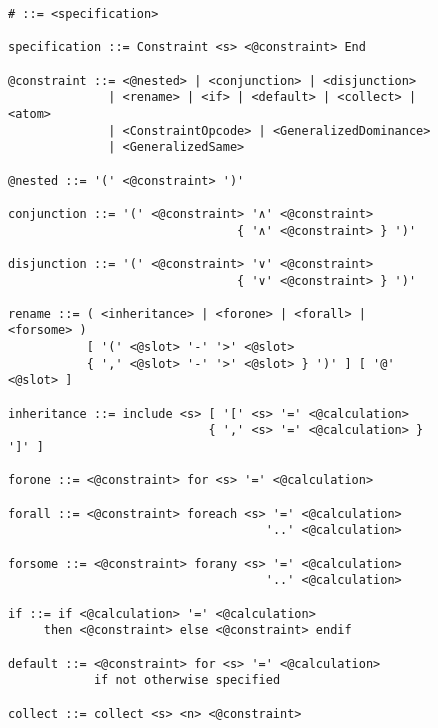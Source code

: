 \begin{figure}[h]
\begin{lstlisting}[language=BNF,basicstyle=\linespread{0.75}\small\ttfamily,
                   captionpos=t,caption=
   {Verbatim display of the grammar file that is used to generate the parser for
    CAnDL.
    The file is in a custom version of Backus–Naur form.
    In the parse tree, all expressions that start with ``{@}'' are
    automatically expanded.
    The character ``\#'' marks the top-level language construct.
    Any expression that does not ultimately become part of this construct
    constitutes a syntax error.}]
# ::= <specification>

specification ::= Constraint <s> <@constraint> End

@constraint ::= <@nested> | <conjunction> | <disjunction>
              | <rename> | <if> | <default> | <collect> | <atom>
              | <ConstraintOpcode> | <GeneralizedDominance>
              | <GeneralizedSame>

@nested ::= '(' <@constraint> ')'

conjunction ::= '(' <@constraint> '∧' <@constraint>
                                { '∧' <@constraint> } ')'

disjunction ::= '(' <@constraint> '∨' <@constraint>
                                { '∨' <@constraint> } ')'

rename ::= ( <inheritance> | <forone> | <forall> | <forsome> )
           [ '(' <@slot> '-' '>' <@slot>
           { ',' <@slot> '-' '>' <@slot> } ')' ] [ '@' <@slot> ]

inheritance ::= include <s> [ '[' <s> '=' <@calculation>
                            { ',' <s> '=' <@calculation> } ']' ]

forone ::= <@constraint> for <s> '=' <@calculation>

forall ::= <@constraint> foreach <s> '=' <@calculation>
                                    '..' <@calculation>

forsome ::= <@constraint> forany <s> '=' <@calculation>
                                    '..' <@calculation>

if ::= if <@calculation> '=' <@calculation>
     then <@constraint> else <@constraint> endif

default ::= <@constraint> for <s> '=' <@calculation>
            if not otherwise specified

collect ::= collect <s> <n> <@constraint>
\end{lstlisting}
\end{figure}

